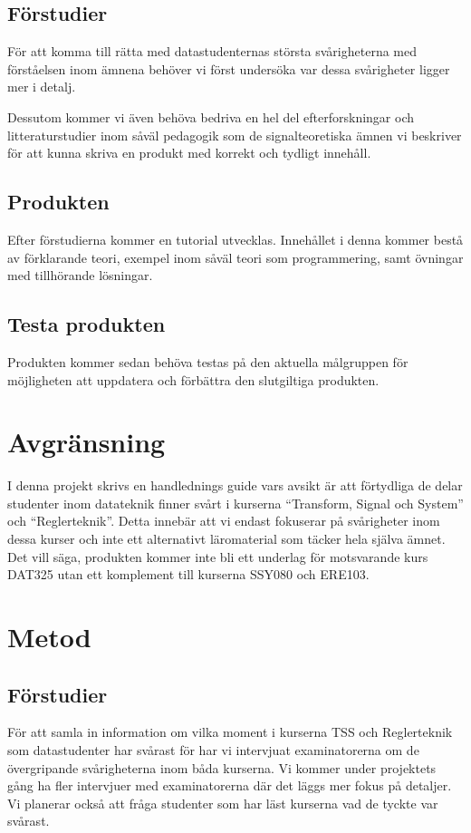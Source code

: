 \documentclass{article}
\begin{document}
\subsection{Förstudier}
För att komma till rätta med datastudenternas största svårigheterna
med förståelsen inom ämnena behöver vi först undersöka var dessa
svårigheter ligger mer i detalj.

Dessutom kommer vi även behöva bedriva en hel del efterforskningar
och litteraturstudier inom såväl pedagogik som de signalteoretiska
ämnen vi beskriver för att kunna skriva en produkt med korrekt och
tydligt innehåll.

\subsection{Produkten}
Efter förstudierna kommer en tutorial utvecklas.
%
Innehållet i denna kommer bestå av förklarande teori,
exempel inom såväl teori som programmering, samt övningar
med tillhörande lösningar.

\subsection{Testa produkten}
Produkten kommer sedan behöva testas på den aktuella målgruppen för
möjligheten att uppdatera och förbättra den slutgiltiga produkten.

\section{Avgränsning}
I denna projekt skrivs en handlednings guide vars avsikt är att
förtydliga de delar studenter inom datateknik finner svårt i kurserna
“Transform, Signal och System” och “Reglerteknik”.
%
Detta innebär att vi endast fokuserar på svårigheter inom dessa kurser
och inte ett alternativt läromaterial som täcker hela själva ämnet.
%
Det vill säga, produkten kommer inte bli ett underlag för motsvarande
kurs DAT325 utan ett komplement till kurserna SSY080 och ERE103.

\section{Metod}
\subsection{Förstudier}
För att samla in information om vilka moment i kurserna
TSS och Reglerteknik som datastudenter har svårast för har
vi intervjuat examinatorerna om de övergripande
svårigheterna inom båda kurserna.
Vi kommer under projektets gång ha fler intervjuer med
examinatorerna där det läggs mer fokus på detaljer.
Vi planerar också att fråga studenter som har läst
kurserna vad de tyckte var svårast.
\end{document}
